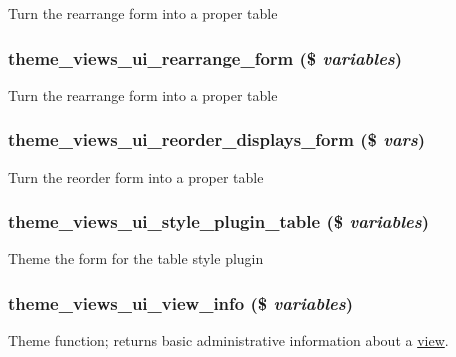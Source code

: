 \label{admin_8inc_a1e764180aedf514cabd8a67e6f311151}
Turn the rearrange form into a proper table \hypertarget{admin_8inc_a3e19a044f97ed6ce2b6c70a15d37e587}{
\subsubsection[{theme\_\-views\_\-ui\_\-rearrange\_\-form}]{\setlength{\rightskip}{0pt plus 5cm}theme\_\-views\_\-ui\_\-rearrange\_\-form (\$ {\em variables})}}
\label{admin_8inc_a3e19a044f97ed6ce2b6c70a15d37e587}
Turn the rearrange form into a proper table \hypertarget{admin_8inc_a202109172df00c7577cdc8e3417f8c0f}{
\subsubsection[{theme\_\-views\_\-ui\_\-reorder\_\-displays\_\-form}]{\setlength{\rightskip}{0pt plus 5cm}theme\_\-views\_\-ui\_\-reorder\_\-displays\_\-form (\$ {\em vars})}}
\label{admin_8inc_a202109172df00c7577cdc8e3417f8c0f}
Turn the reorder form into a proper table \hypertarget{admin_8inc_ad4ad8284b228b18c4e1dec545588803e}{
\subsubsection[{theme\_\-views\_\-ui\_\-style\_\-plugin\_\-table}]{\setlength{\rightskip}{0pt plus 5cm}theme\_\-views\_\-ui\_\-style\_\-plugin\_\-table (\$ {\em variables})}}
\label{admin_8inc_ad4ad8284b228b18c4e1dec545588803e}
Theme the form for the table style plugin \hypertarget{admin_8inc_ae33cf97db5411d888f7bebca4521d3df}{
\subsubsection[{theme\_\-views\_\-ui\_\-view\_\-info}]{\setlength{\rightskip}{0pt plus 5cm}theme\_\-views\_\-ui\_\-view\_\-info (\$ {\em variables})}}
\label{admin_8inc_ae33cf97db5411d888f7bebca4521d3df}
Theme function; returns basic administrative information about a \hyperlink{classview}{view}.

